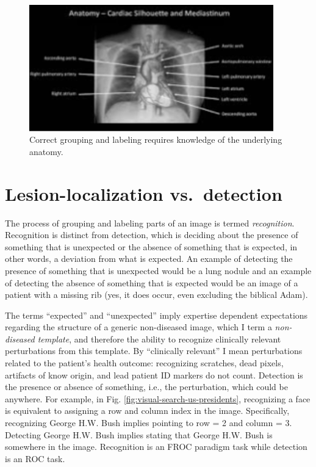 \documentclass[
]{book}
\begin{document}
\begin{figure}

{\centering \includegraphics[width=300pt]{images/15-visual-search/chest-imageB} 

}

\caption{Correct grouping and labeling requires knowledge of the underlying anatomy.}\label{fig:visual-search-chest-images2}
\end{figure}

\hypertarget{visual-search-recognition-detection}{%
\section{Lesion-localization vs.~detection}\label{visual-search-recognition-detection}}

The process of grouping and labeling parts of an image is termed \emph{recognition}. Recognition is distinct from detection, which is deciding about the presence of something that is unexpected or the absence of something that is expected, in other words, a deviation from what is expected. An example of detecting the presence of something that is unexpected would be a lung nodule and an example of detecting the absence of something that is expected would be an image of a patient with a missing rib (yes, it does occur, even excluding the biblical Adam).

The terms ``expected'' and ``unexpected'' imply expertise dependent expectations regarding the structure of a generic non-diseased image, which I term a \emph{non-diseased template}, and therefore the ability to recognize clinically relevant perturbations from this template. By ``clinically relevant'' I mean perturbations related to the patient's health outcome: recognizing scratches, dead pixels, artifacts of know origin, and lead patient ID markers do not count. Detection is the presence or absence of something, i.e., the perturbation, which could be anywhere. For example, in Fig. \ref{fig:visual-search-us-presidents}, recognizing a face is equivalent to assigning a row and column index in the image. Specifically, recognizing George H.W. Bush implies pointing to row = 2 and column = 3. Detecting George H.W. Bush implies stating that George H.W. Bush is somewhere in the image. Recognition is an FROC paradigm task while detection is an ROC task.
\end{document}

